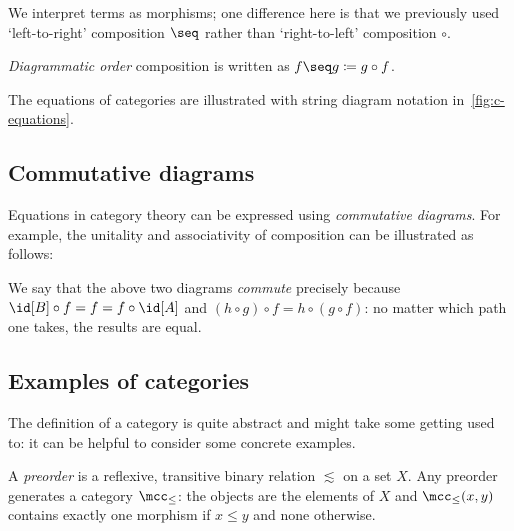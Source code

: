 We interpret terms as morphisms; one difference here is that we previously used
`left-to-right' composition \(\seq\) rather than `right-to-left' composition
\(\circ\).

\begin{notation}
    \emph{Diagrammatic order} composition is written as
    \(f \seq g \coloneqq g \circ f\).
\end{notation}



The equations of categories are illustrated with string diagram notation
in~\cref{fig:c-equations}.

\subsection{Commutative diagrams}

Equations in category theory can be expressed using \emph{commutative diagrams}.
For example, the unitality and associativity of composition can be illustrated
as follows:

\begin{center}
    
    \quad
    
\end{center}

We say that the above two diagrams \emph{commute} precisely because \(
\id[B] \circ f = f = f \circ \id[A]
\) and \((h \circ g) \circ f = h \circ (g \circ f)\): no matter which path one
takes, the results are equal.

\subsection{Examples of categories}

The definition of a category is quite abstract and might take some getting used
to: it can be helpful to consider some concrete examples.

\begin{example}[Preorder]
    A \emph{preorder} is a reflexive, transitive binary relation \(\lesssim\) on
    a
    set \(X\).
    Any preorder generates a category \(\mcc_\leq\): the objects are the
    elements of \(X\) and \(\mcc_\leq(x, y)\) contains exactly one morphism if
    \(x \leq y\) and none otherwise.
\end{example}

